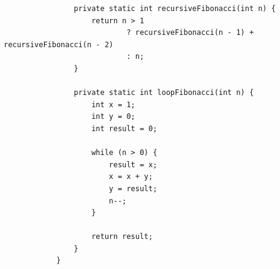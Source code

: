 \documentclass[12pt,titlepage]{article}
\begin{document}
\begin{enumerate}
{\begin{verbatim}
                private static int recursiveFibonacci(int n) {
                    return n > 1
                            ? recursiveFibonacci(n - 1) + recursiveFibonacci(n - 2)
                            : n;
                }

                private static int loopFibonacci(int n) {
                    int x = 1;
                    int y = 0;
                    int result = 0;

                    while (n > 0) {
                        result = x;
                        x = x + y;
                        y = result;
                        n--;
                    }

                    return result;
                }
            }
        \end{verbatim}
    }
\end{enumerate}
\end{document}

